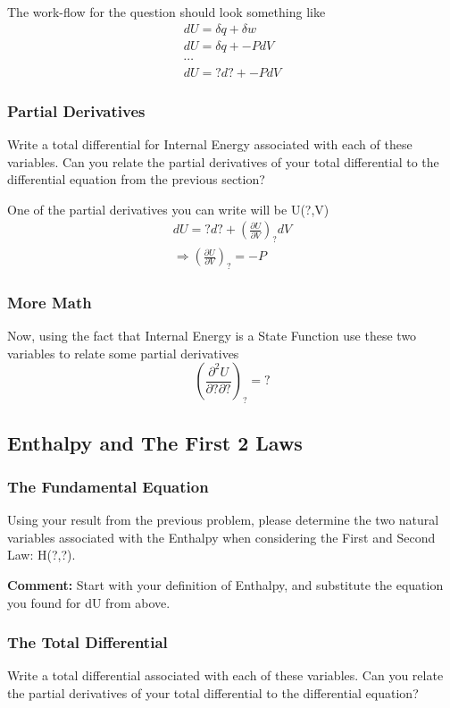 \documentclass{article}
\newcommand{\be}{\begin{equation}}
\newcommand{\ee}{\end{equation}}
\newcommand{\pd}{\partial}
\begin{document}
The work-flow for the question should look something like
\be
\begin{split}
dU = \delta q + \delta w\\
dU = \delta q + -PdV\\
\cdots \\
dU = ?d? + -PdV
\end{split}
\ee

\subsubsection{Partial Derivatives}
Write a total differential for Internal Energy associated with each of these variables.
Can you relate the partial derivatives of your total differential to the differential equation from the previous section?

One of the partial derivatives you can write will be 
U(?,V)
\be
\begin{split}
dU = ? d? + \left(\frac{\pd U}{\pd V}\right)_?dV\\
\Rightarrow \left(\frac{\pd U}{\pd V}\right)_? = -P
\end{split}
\ee

\subsubsection{More Math}
Now, using the fact that Internal Energy is a State Function use these two variables to relate some partial derivatives 
\be
\left(\frac{\pd ^2 U}{\pd ? \pd ?}\right)_? = ?
\ee

\subsection{Enthalpy and The First 2 Laws}

\subsubsection{The Fundamental Equation}
Using your result from the previous problem, please determine the two natural variables associated with the Enthalpy when considering the First and Second Law: H(?,?).

\textbf{Comment:} 
Start with your definition of Enthalpy, and substitute the equation you found for dU from above. 

\subsubsection{The Total Differential}
Write a total differential associated with each of these variables.
Can you relate the partial derivatives of your total differential to the differential equation?
\end{document}
